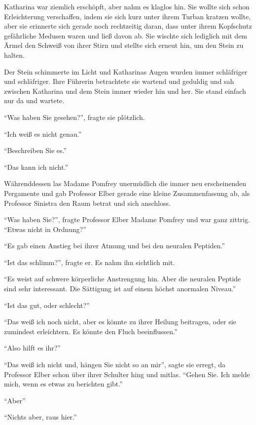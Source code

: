 Katharina war ziemlich erschöpft, aber nahm es klaglos hin. Sie wollte sich schon Erleichterung verschaffen, indem sie sich kurz unter ihrem Turban kratzen wollte, aber sie erinnerte sich gerade noch rechtzeitig daran, dass unter ihrem Kopfschutz gefährliche Medusen waren und ließ davon ab. Sie wischte sich lediglich mit dem Ärmel den Schweiß von ihrer Stirn und stellte sich erneut hin, um den Stein zu halten.

Der Stein schimmerte im Licht und Katharinas Augen wurden immer schläfriger und schläfriger. Ihre Führerin betrachtete sie wartend und geduldig und sah zwischen Katharina und dem Stein immer wieder hin und her. Sie stand einfach nur da und wartete.

\enquote{Was haben Sie gesehen?}, fragte sie plötzlich.

\enquote{Ich weiß es nicht genau.}

\enquote{Beschreiben Sie es.}

\enquote{Das kann ich nicht.}

Währenddessen las Madame Pomfrey unermüdlich die immer neu erscheinenden Pergamente und gab Professor Elber gerade eine kleine Zusammenfassung ab, als Professor Sinistra den Raum betrat und sich anschloss.

\enquote{Was haben Sie?}, fragte Professor Elber Madame Pomfrey und war ganz zittrig. \enquote{Etwas nicht in Ordnung?}

\enquote{Es gab einen Anstieg bei ihrer Atmung und bei den neuralen Peptiden.}

\enquote{Ist das schlimm?}, fragte er. Es nahm ihn sichtlich mit.

\enquote{Es weist auf schwere körperliche Anstrengung hin. Aber die neuralen Peptide sind sehr interessant. Die Sättigung ist auf einem höchst anormalen Niveau.}

\enquote{Ist das gut, oder schlecht?}

\enquote{Das weiß ich noch nicht, aber es könnte zu ihrer Heilung beitragen, oder sie zumindest erleichtern. \gst Es könnte den Fluch beeinflussen.}

\enquote{Also hilft es ihr?}

\enquote{Das weiß ich nicht und, hängen Sie nicht so an mir}, sagte sie erregt, da Professor Elber schon über ihrer Schulter hing und mitlas. \enquote{Gehen Sie. Ich melde mich, wenn es etwas zu berichten gibt.}

\enquote{Aber\abs}

\enquote{Nichts aber, raus hier.}

